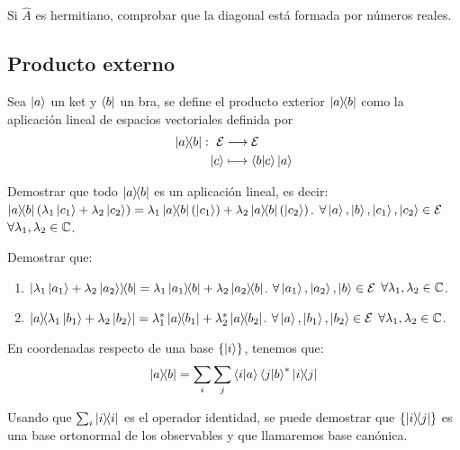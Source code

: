 \begin{exercise}
	Si $\hat{A}$ es hermitiano, comprobar que la diagonal está formada por números reales.
\end{exercise}

\subsection{Producto externo}\label{subsec:producto-externo}
Sea $\ket{a}$ un ket y $\bra{b}$ un bra, se define el producto exterior $\ketbra{a}{b}$ como la aplicación lineal de espacios vectoriales definida por
\begin{equation}
	\label{eq:producto-externo}
	\begin{split}
		\ketbra{a}{b}:\ \mathcal{E} & \longrightarrow \mathcal{E} \\ \ket{c} & \longmapsto \braket{b}{c}\ket{a}
	\end{split}
\end{equation}

\begin{exercise}
	Demostrar que todo $\ketbra{a}{b}$ es un aplicación lineal, es decir:
	$\ketbra{a}{b}(\lambda_1\ket{c_1}+\lambda_2\ket{c_2})=\lambda_1\ketbra{a}{b}(\ket{c_1})+\lambda_2\ketbra{a}{b}(\ket{c_2})$. $\forall \ket{a}, \ket{b}, \ket{c_1}, \ket{c_2}\in\mathcal{E}$ $\forall\lambda_1,\lambda_2\in\mathbb{C}$.
\end{exercise}

\begin{exercise}
	Demostrar que:
	\begin{enumerate}
		\item $\ketbra{\lambda_1\ket{a_1}+\lambda_2\ket{a_2}}{b}=\lambda_1\ketbra{a_1}{b}+\lambda_2\ketbra{a_2}{b}$. $\forall \ket{a_1}, \ket{a_2}, \ket{b}\in\mathcal{E}$ $\forall\lambda_1,\lambda_2\in\mathbb{C}$.
		\item $\ketbra{a}{\lambda_1\ket{b_1}+\lambda_2\ket{b_2}}=\lambda_1^*\ketbra{a}{b_1}+\lambda_2^*\ketbra{a}{b_2}$. $\forall \ket{a}, \ket{b_1}, \ket{b_2}\in\mathcal{E}$ $\forall\lambda_1,\lambda_2\in\mathbb{C}$.
	\end{enumerate}
\end{exercise}
En coordenadas respecto de una base $\qty{\ket{i}}$, tenemos que:
\begin{equation}
	\label{eq:producto-externo-dirac}
	\ketbra{a}{b} = \sum_{i}\sum_{j}\braket{i}{a}\braket{j}{b}^*\ketbra{i}{j}
\end{equation}

Usando que $\sum_i \ketbra{i}{i}$ es el operador identidad, se puede demostrar que $\qty{\ketbra{i}{j}}$ es una base ortonormal de los observables y que llamaremos base canónica.

